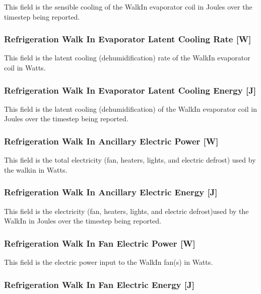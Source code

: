 This field is the sensible cooling of the WalkIn evaporator coil in Joules over the timestep being reported.

\subsubsection{Refrigeration Walk In Evaporator Latent Cooling Rate {[}W{]}}\label{refrigeration-walk-in-evaporator-latent-cooling-rate-w}

This field is the latent cooling (dehumidification) rate of the WalkIn evaporator coil in Watts.

\subsubsection{Refrigeration Walk In Evaporator Latent Cooling Energy {[}J{]}}\label{refrigeration-walk-in-evaporator-latent-cooling-energy-j}

This field is the latent cooling (dehumidification) of the WalkIn evaporator coil in Joules over the timestep being reported.

\subsubsection{Refrigeration Walk In Ancillary Electric Power {[}W{]}}\label{refrigeration-walk-in-ancillary-electric-power-w}

This field is the total electricity (fan, heaters, lights, and electric defrost) used by the walkin in Watts.

\subsubsection{Refrigeration Walk In Ancillary Electric Energy {[}J{]}}\label{refrigeration-walk-in-ancillary-electric-energy-j}

This field is the electricity (fan, heaters, lights, and electric defrost)used by the WalkIn in Joules over the timestep being reported.

\subsubsection{Refrigeration Walk In Fan Electric Power {[}W{]}}\label{refrigeration-walk-in-fan-electric-power-w}

This field is the electric power input to the WalkIn fan(s) in Watts.

\subsubsection{Refrigeration Walk In Fan Electric Energy {[}J{]}}\label{refrigeration-walk-in-fan-electric-energy-j}

